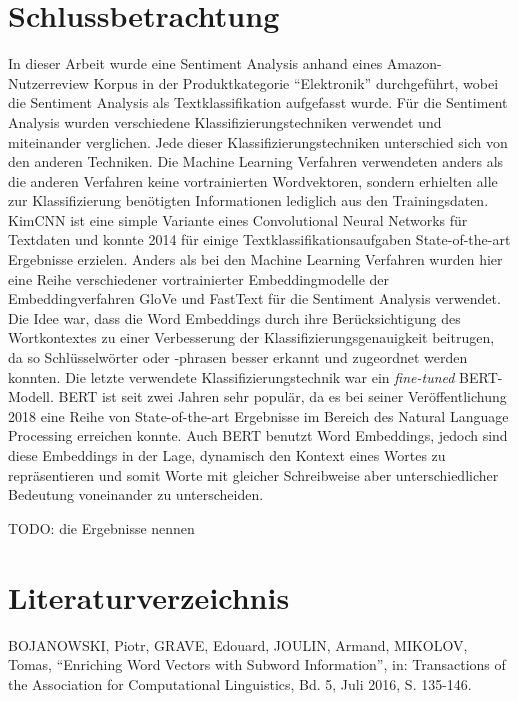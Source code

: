 \documentclass[11pt]{article}
\begin{document}
    \hypertarget{schlussbetrachtung}{%
\section{Schlussbetrachtung}\label{schlussbetrachtung}}

In dieser Arbeit wurde eine Sentiment Analysis anhand eines
Amazon-Nutzerreview Korpus in der Produktkategorie ``Elektronik''
durchgeführt, wobei die Sentiment Analysis als Textklassifikation
aufgefasst wurde. Für die Sentiment Analysis wurden verschiedene
Klassifizierungstechniken verwendet und miteinander verglichen. Jede
dieser Klassifizierungstechniken unterschied sich von den anderen
Techniken. Die Machine Learning Verfahren verwendeten anders als die
anderen Verfahren keine vortrainierten Wordvektoren, sondern erhielten
alle zur Klassifizierung benötigten Informationen lediglich aus den
Trainingsdaten. KimCNN ist eine simple Variante eines Convolutional
Neural Networks für Textdaten und konnte 2014 für einige
Textklassifikationsaufgaben State-of-the-art Ergebnisse erzielen. Anders
als bei den Machine Learning Verfahren wurden hier eine Reihe
verschiedener vortrainierter Embeddingmodelle der Embeddingverfahren
GloVe und FastText für die Sentiment Analysis verwendet. Die Idee war,
dass die Word Embeddings durch ihre Berücksichtigung des Wortkontextes
zu einer Verbesserung der Klassifizierungsgenauigkeit beitrugen, da so
Schlüsselwörter oder -phrasen besser erkannt und zugeordnet werden
konnten. Die letzte verwendete Klassifizierungstechnik war ein
\emph{fine-tuned} BERT-Modell. BERT ist seit zwei Jahren sehr populär,
da es bei seiner Veröffentlichung 2018 eine Reihe von State-of-the-art
Ergebnisse im Bereich des Natural Language Processing erreichen konnte.
Auch BERT benutzt Word Embeddings, jedoch sind diese Embeddings in der
Lage, dynamisch den Kontext eines Wortes zu repräsentieren und somit
Worte mit gleicher Schreibweise aber unterschiedlicher Bedeutung
voneinander zu unterscheiden.

TODO: die Ergebnisse nennen

    \hypertarget{literaturverzeichnis}{%
\section{Literaturverzeichnis}\label{literaturverzeichnis}}

BOJANOWSKI, Piotr, GRAVE, Edouard, JOULIN, Armand, MIKOLOV, Tomas,
``Enriching Word Vectors with Subword Information'', in: Transactions of
the Association for Computational Linguistics, Bd. 5, Juli 2016, S.
135-146.
\end{document}
